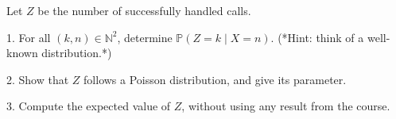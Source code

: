 \documentclass[a4paper,12pt]{article}
\begin{document}
Let \( Z \) be the number of successfully handled calls.



1. For all \( (k, n) \in \mathbb{N}^2 \), determine \( \mathbb{P}(Z = k \mid X = n) \).  
(*Hint: think of a well-known distribution.*)

2. Show that \( Z \) follows a Poisson distribution, and give its parameter.

3. Compute the expected value of \( Z \), without using any result from the course.



\vspace{1em}




\vspace{1em}


\end{document}
